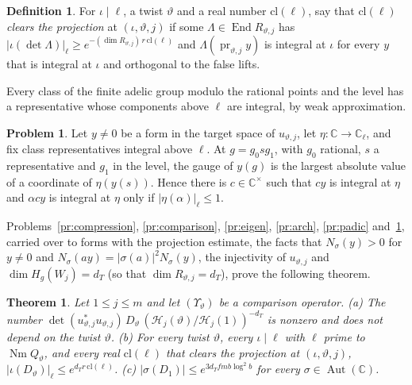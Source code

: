 \documentclass[reqno]{amsart}
\theoremstyle{definition}
\newtheorem{problem}{Problem}[section]
\newtheorem{definition}{Definition}[section]
\theoremstyle{plain}
\newtheorem{theorem}{Theorem}[section]
\theoremstyle{remark}
\newcommand{\C}{{\mathbb{C}}}
\newcommand{\Hc}{{\mathcal{H}}}
\newcommand{\pr}{\operatorname{pr}}
\newcommand{\End}{\operatorname{End}}
\newcommand{\Aut}{\operatorname{Aut}}
\newcommand{\Nm}{\operatorname{Nm}}
\newcommand{\cl}{\mathrm{cl}}
\begin{document}
\begin{definition}\label{def:clears}
For \(\iota \mid \ell\), a twist \(\vartheta\) and a real number \(\cl(\ell)\), say that \(\cl(\ell)\) \emph{clears the projection} at \((\iota,\vartheta,j)\) if some \(\Lambda \in \End R_{\vartheta,j}\) has \(\lvert\iota(\det\Lambda)\rvert_\ell \ge e^{-(\dim R_{\vartheta,j})\,r\,\cl(\ell)}\) and \(\Lambda(\pr_{\vartheta,j}y)\) is integral at \(\iota\) for every \(y\) that is integral at \(\iota\) and orthogonal to the false lifts.
\end{definition}

Every class of the finite adelic group modulo the rational points and the level has a representative whose components above \(\ell\) are integral, by weak approximation.

\begin{problem}\label{pr:scale}
Let \(y \ne 0\) be a form in the target space of \(u_{\vartheta,j}\), let \(\eta \colon \C \to \C_\ell\), and fix class representatives integral above \(\ell\).  At \(g = g_0 s g_1\), with \(g_0\) rational, \(s\) a representative and \(g_1\) in the level, the gauge of \(y(g)\) is the largest absolute value of a coordinate of \(\eta(y(s))\).  Hence there is \(c \in \C^\times\) such that \(cy\) is integral at \(\eta\) and \(\alpha c y\) is integral at \(\eta\) only if \(\lvert\eta(\alpha)\rvert_\ell \le 1\).
\end{problem}

Problems~\ref{pr:compression}, \ref{pr:comparison}, \ref{pr:eigen}, \ref{pr:arch}, \ref{pr:padic} and~\ref{pr:scale}, carried over to forms with the projection estimate, the facts that \(N_\sigma(y) > 0\) for \(y \ne 0\) and \(N_\sigma(ay) = \lvert\sigma(a)\rvert^2 N_\sigma(y)\), the injectivity of \(u_{\vartheta,j}\) and \(\dim H_g(W_j) = d_T\) (so that \(\dim R_{\vartheta,j} = d_T\)), prove the following theorem.

\begin{theorem}\label{thm:compression}
Let \(1 \le j \le m\) and let \((\Upsilon_\vartheta)\) be a comparison operator.
\textup{(a)} The number \(\det(u_{\vartheta,j}^*u_{\vartheta,j})\,D_\vartheta\,(\Hc_j(\vartheta)/\Hc_j(1))^{-d_T}\) is nonzero and does not depend on the twist \(\vartheta\).
\textup{(b)} For every twist \(\vartheta\), every \(\iota \mid \ell\) with \(\ell\) prime to \(\Nm Q_\vartheta\), and every real \(\cl(\ell)\) that clears the projection at \((\iota,\vartheta,j)\), \(\lvert\iota(D_\vartheta)\rvert_\ell \le e^{d_T r\,\cl(\ell)}\).
\textup{(c)} \(\lvert\sigma(D_1)\rvert \le e^{3d_T fmb\log^2 b}\) for every \(\sigma \in \Aut(\C)\).
\end{theorem}
\end{document}
